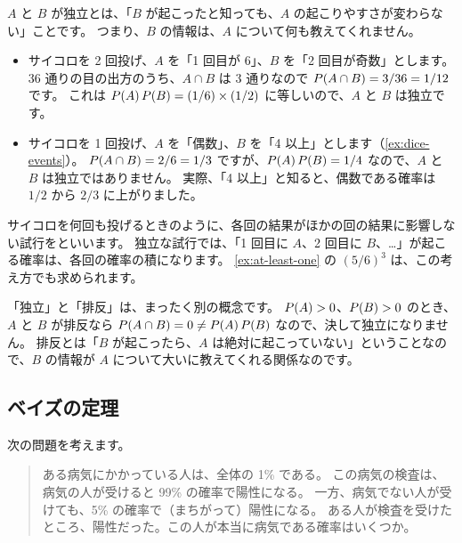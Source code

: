 \begin{intuition}
  $A$ と $B$ が独立とは、「$B$ が起こったと知っても、$A$ の起こりやすさが変わらない」ことです。
  つまり、$B$ の情報は、$A$ について何も教えてくれません。
\end{intuition}

\begin{example}[独立な事象と従属な事象][ex:independence]
  \begin{itemize}
    \item サイコロを 2 回投げ、$A$ を「1 回目が 6」、$B$ を「2 回目が奇数」とします。
      36 通りの目の出方のうち、$A \cap B$ は $3$ 通りなので $P(A \cap B) = 3/36 = 1/12$ です。
      これは $P(A)\,P(B) = (1/6) \times (1/2)$ に等しいので、$A$ と $B$ は独立です。
    \item サイコロを 1 回投げ、$A$ を「偶数」、$B$ を「4 以上」とします（\cref{ex:dice-events}）。
      $P(A \cap B) = 2/6 = 1/3$ ですが、$P(A)\,P(B) = 1/4$ なので、$A$ と $B$ は独立ではありません。
      実際、「4 以上」と知ると、偶数である確率は $1/2$ から $2/3$ に上がりました。
  \end{itemize}
\end{example}

サイコロを何回も投げるときのように、各回の結果がほかの回の結果に影響しない試行をといいます。
独立な試行では、「1 回目に $A$、2 回目に $B$、\dots」が起こる確率は、各回の確率の積になります。
\cref{ex:at-least-one} の $(5/6)^3$ は、この考え方でも求められます。

\begin{exampoint}
  「独立」と「排反」は、まったく別の概念です。
  $P(A) > 0$、$P(B) > 0$ のとき、$A$ と $B$ が排反なら $P(A \cap B) = 0 \ne P(A)\,P(B)$ なので、決して独立になりません。
  排反とは「$B$ が起こったら、$A$ は絶対に起こっていない」ということなので、$B$ の情報が $A$ について大いに教えてくれる関係なのです。
\end{exampoint}

\subsection{ベイズの定理}

次の問題を考えます。

\begin{quote}
  ある病気にかかっている人は、全体の 1\% である。
  この病気の検査は、病気の人が受けると 99\% の確率で陽性になる。
  一方、病気でない人が受けても、5\% の確率で（まちがって）陽性になる。
  ある人が検査を受けたところ、陽性だった。この人が本当に病気である確率はいくつか。
\end{quote}

